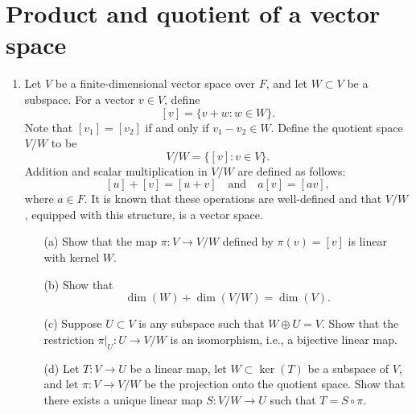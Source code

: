 \documentclass{article}
\theoremstyle{remark}
\begin{document}
\section*{Product and quotient of a vector space}
    \begin{enumerate}
        \item Let \( V \) be a finite-dimensional vector space over \( F \), and let \( W \subset V \) be a subspace. For a vector \( v \in V \), define 
        \[
        [v] = \{v + w : w \in W\}.
        \]
        Note that \( [v_1] = [v_2] \) if and only if \( v_1 - v_2 \in W \). Define the quotient space \( V / W \) to be
        \[
        V / W = \{[v] : v \in V\}.
        \]
        Addition and scalar multiplication in \( V / W \) are defined as follows:
        \[
        [u] + [v] = [u + v] \quad \text{and} \quad a[v] = [av],
        \]
        where \( a \in F \). It is known that these operations are well-defined and that \( V / W \), equipped with this structure, is a vector space.
        
        \begin{enumerate}
            \item[(a)] Show that the map \( \pi: V \to V / W \) defined by \( \pi(v) = [v] \) is linear with kernel \( W \).
            \item[(b)] Show that 
            \[
            \dim(W) + \dim(V / W) = \dim(V).
            \]
            \item[(c)] Suppose \( U \subset V \) is any subspace such that \( W \oplus U = V \). Show that the restriction \( \pi|_U: U \to V / W \) is an isomorphism, i.e., a bijective linear map.
            \item[(d)] Let \( T: V \to U \) be a linear map, let \( W \subset \ker(T) \) be a subspace of \( V \), and let \( \pi: V \to V / W \) be the projection onto the quotient space. Show that there exists a unique linear map \( S: V / W \to U \) such that \( T = S \circ \pi \).
        \end{enumerate}
    \end{enumerate}
\end{document}
